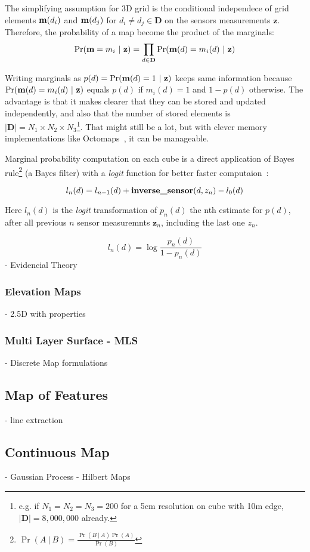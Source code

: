 The simplifying assumption for 3D grid is the conditional
independece of grid
elements $\mathrm{\mathbf{m}}(d_i)$ and $\mathrm{\mathbf{m}}(d_j)$ for $d_i\neq d_j \in \mathbf{D}$
on the sensors measurements $\mathbf{z}$.
Therefore, the probability of a map become the product of the marginals:
\begin{equation*}
\Pr(\mathrm{\mathbf{m}}=m_i~|~\mathbf{z})=\prod_{d\in\mathbf{D}}\Pr(\mathrm{\mathbf{m}}(d)=m_i(d)~|~\mathbf{z})
\end{equation*}

Writing marginals as $p(d) = \Pr(\mathrm{\mathbf{m}}(d)=1~|~\mathbf{z})$ keeps same
information because $\Pr(\mathrm{\mathbf{m}}(d)=m_i(d)~|~\mathbf{z})$ equals $p(d)$ if
$m_i(d)=1$ and $1-p(d)$ otherwise. The advantage is that it makes clearer that
they can be stored and updated independently, and also that the number of stored
elements is $|\mathbf{D}|=N_1\times N_2\times N_3$\footnote{e.g. if
$N_1=N_2=N_3=200$ for a 5cm resolution on cube with 10m edge,
$|\mathbf{D}|=8,000,000$ already.}.
That might still be a lot, but with clever memory implementations like
Octomaps~\cite{hornung2013octomap}, it can be manageable.

Marginal probability computation on each cube is a direct application of Bayes
rule\footnote{$\Pr(A~|~B)=\frac{\Pr(B~|~A)\Pr(A)}{\Pr(B)}$} (a Bayes filter)
with a \textit{logit} function for better faster computaion~\cite{thrunprob}:

\begin{equation}
l_n(d) = l_{n-1}(d)+ \text{\textbf{inverse\_sensor}}(d,z_n) - l_0(d)
\end{equation}

Here $l_n(d)$ is the \textit{logit} transformation of $p_n(d)$ the nth estimate
for $p(d)$, after all previous $n$ sensor measuremnts $\mathbf{z}_n$, including
the last one $z_n$.

\begin{equation*}
l_n(d) = \log\frac{p_n(d)}{1-p_n(d)} 
\end{equation*}
\citet{Pagac1998} - Evidencial Theory


\subsubsection{Elevation Maps}
\citet{Coiras2007} - 2.5D with properties

\subsubsection{Multi Layer Surface - MLS}

\citet{Schwendner2013} - Discrete Map formulations


\subsection{Map of Features}
\citet{Ribas2006} - line extraction


\subsection{Continuous Map}
\citet{gan20093d} - Gaussian Process
\citet{ramos2016hilbert} - Hilbert Maps